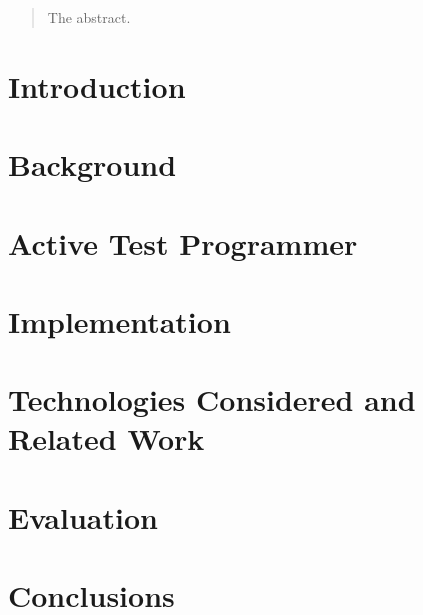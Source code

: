 \documentclass[twocolumn]{article}
\begin{document}


\begin{abstract}

The abstract.

\end{abstract}

\section{Introduction}

\section{Background}

\section{Active Test Programmer}

\section{Implementation}

\section{Technologies Considered and Related Work}

\section{Evaluation}

\section{Conclusions}



\end{document}
